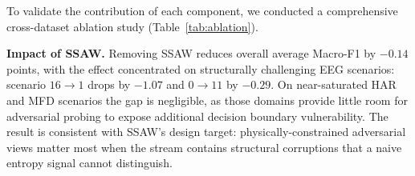 \documentclass[sigconf, screen, review, anonymous]{acmart}
\theoremstyle{plain}
\theoremstyle{definition}
\theoremstyle{remark}
\begin{document}
	To validate the contribution of each component, we conducted a
	comprehensive cross-dataset ablation study (Table~\ref{tab:ablation}).

\begin{table}[!t]
	\centering
	\caption{\textbf{Cross-Dataset Ablation Study (Macro-F1 \%).} We evaluate component contributions across all three datasets. Average is computed over five transfer scenarios per dataset. Gains concentrate on hard scenarios; near-saturated scenarios dilute dataset-level averages.}
	\label{tab:ablation}
	\begin{small}
		\begin{sc}
		\end{sc}
	\end{small}
\end{table}

	\textbf{Impact of SSAW.}
	Removing SSAW reduces overall average Macro-F1 by $-0.14$ points, with the effect concentrated on structurally challenging EEG scenarios: scenario $16{\to}1$ drops by $-1.07$ and $0{\to}11$ by $-0.29$. On near-saturated HAR and MFD scenarios the gap is negligible, as those domains provide little room for adversarial probing to expose additional decision boundary vulnerability. The result is consistent with SSAW's design target: physically-constrained adversarial views matter most when the stream contains structural corruptions that a naive entropy signal cannot distinguish.
	
\end{document}
